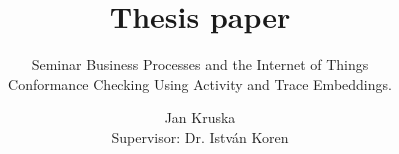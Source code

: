 \documentclass[runningheads]{template/llncs}
\begin{document}
%
\title{Thesis paper}
\subtitle{Seminar Business Processes and the Internet of Things \\ Conformance Checking Using Activity and Trace Embeddings.}
%
%
\author{Jan Kruska \\ Supervisor: Dr. István Koren}
%
%
%
\maketitle              %
%
\begin{abstract}
\end{abstract}
%
%
%
\end{document}
